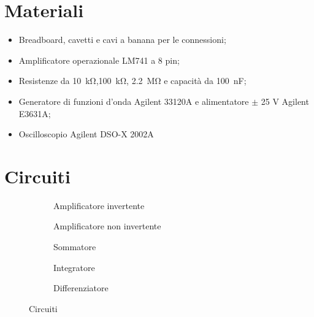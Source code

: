 \section*{Materiali}

\begin{itemize}
    \item{Breadboard, cavetti e cavi a banana per le connessioni;}
    \item{Amplificatore operazionale LM741 a 8 pin;}
    \item{Resistenze da \SI{10}{\kilo\ohm},\SI{100}{\kilo\ohm}, \SI{2.2}{\mega\ohm} e capacità da
        \SI{100}{\nano\farad};}
    \item{Generatore di funzioni d'onda Agilent 33120A e alimentatore $\pm$ 25 V Agilent E3631A;}
    \item{Oscilloscopio Agilent DSO-X 2002A}
\end{itemize}

\section*{Circuiti}

\begin{figure}[h!]
    \small
    \centering
    \begin{subfigure}[t]{0.32\textwidth}
        \def\svgwidth{\columnwidth}
        
        \caption{Amplificatore invertente}
        \label{fig:amp_inv}
    \end{subfigure}
    \begin{subfigure}[t]{0.32\textwidth}
        \def\svgwidth{\columnwidth}
        
        \caption{Amplificatore non invertente}
        \label{fig:amp_noninv}
    \end{subfigure}
    \vspace{3mm}
    \begin{subfigure}[t]{0.32\textwidth}
        \def\svgwidth{\columnwidth}
        
        \caption{Sommatore}
        \label{fig:sum}
    \end{subfigure}
    \begin{subfigure}[t]{0.4\textwidth}
        \def\svgwidth{\columnwidth}
        
        \caption{Integratore}
        \label{fig:int}
    \end{subfigure}
    \begin{subfigure}[t]{0.4\textwidth}
        \def\svgwidth{\columnwidth}
        
        \caption{Differenziatore}
        \label{fig:diff}
    \end{subfigure}
    \caption{Circuiti}
    \label{fig:circuiti}
\end{figure}
